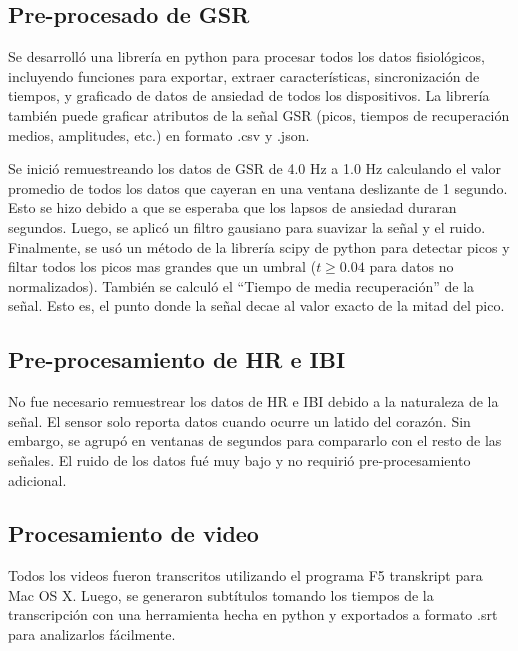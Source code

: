 \subsection{Pre-procesado de GSR}\label{secc:gsrpreprocessing}
Se desarroll\'o una librer\'ia en python para procesar todos los datos fisiol\'ogicos, incluyendo funciones para exportar, extraer caracter\'isticas, sincronizaci\'on de tiempos, y graficado de datos de ansiedad de todos los dispositivos. La librer\'ia tambi\'en puede graficar atributos de la se\~nal GSR (picos, tiempos de recuperaci\'on medios, amplitudes, etc.) en formato .csv y .json.

Se inici\'o remuestreando los datos de GSR de 4.0 Hz a 1.0 Hz calculando el valor promedio de todos los datos que cayeran en una ventana deslizante de 1 segundo. Esto se hizo debido a que se esperaba que los lapsos de ansiedad duraran segundos. Luego, se aplic\'o un filtro gausiano para suavizar la se\~nal y el ruido. Finalmente, se us\'o un m\'etodo de la librer\'ia scipy de python para detectar picos y filtar todos los picos mas grandes que un umbral ($t \geqslant 0.04$ para datos no normalizados). Tambi\'en se calcul\'o el ``Tiempo de media recuperaci\'on'' de la se\~nal. Esto es, el punto donde la se\~nal decae al valor exacto de la mitad del pico.

\subsection{Pre-procesamiento de HR e IBI}\label{secc:hribipreprocessing}
No fue necesario remuestrear los datos de HR e IBI debido a la naturaleza de la se\~nal. El sensor solo reporta datos cuando ocurre un latido del coraz\'on. Sin embargo, se agrup\'o en ventanas de segundos para compararlo con el resto de las se\~nales. El ruido de los datos fu\'e muy bajo y no requiri\'o pre-procesamiento adicional.

\subsection{Procesamiento de video}\label{secc:videoprocesing}
Todos los videos fueron transcritos utilizando el programa F5 transkript para Mac OS X. Luego, se generaron subt\'itulos tomando los tiempos de la transcripci\'on con una herramienta hecha en python y exportados a formato .srt para analizarlos f\'acilmente.
